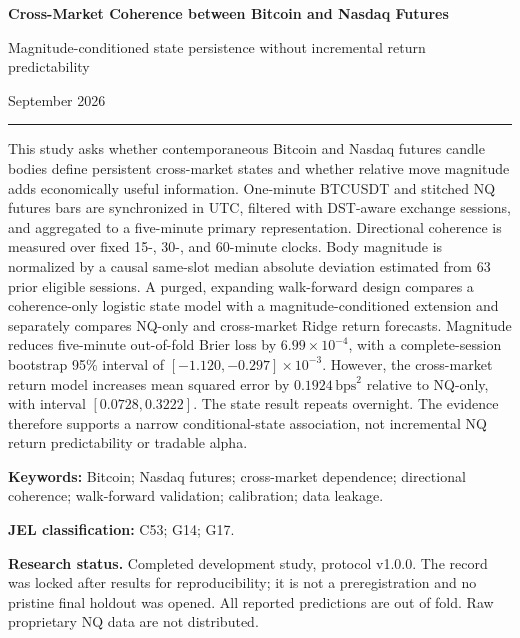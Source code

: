 \documentclass[11pt]{article}
\newcommand{\bps}{\mathrm{bps}}
\newcommand{\statusline}[1]{\noindent\small #1}
\begin{document}
\begin{titlepage}
  \thispagestyle{empty}
  \vspace*{1.5cm}
  {\raggedright\Huge\bfseries
    Cross-Market Coherence between Bitcoin and Nasdaq Futures\par}
  \vspace{0.35cm}
  {\raggedright\Large
    Magnitude-conditioned state persistence without incremental return predictability\par}
  \vspace{0.85cm}
  \par
  \vspace{0.12cm}
  \statusline{September 2026}
  \vspace{0.65cm}
  \hrule
  \vspace{0.5cm}

  \par
  \vspace{0.25cm}
  {\small\noindent
  This study asks whether contemporaneous Bitcoin and Nasdaq futures candle bodies
  define persistent cross-market states and whether relative move magnitude adds
  economically useful information. One-minute BTCUSDT and stitched NQ futures bars are
  synchronized in UTC, filtered with DST-aware exchange sessions, and aggregated to a
  five-minute primary representation. Directional coherence is measured over fixed
  15-, 30-, and 60-minute clocks. Body magnitude is normalized by a causal same-slot
  median absolute deviation estimated from 63 prior eligible sessions. A purged,
  expanding walk-forward design compares a coherence-only logistic state model with a
  magnitude-conditioned extension and separately compares NQ-only and cross-market
  Ridge return forecasts. Magnitude reduces five-minute out-of-fold Brier loss by
  $6.99\times10^{-4}$, with a complete-session bootstrap 95\% interval of
  $[-1.120,-0.297]\times10^{-3}$. However, the cross-market return model increases mean
  squared error by $0.1924\,\bps^2$ relative to NQ-only, with interval
  $[0.0728,0.3222]$. The state result repeats overnight. The evidence therefore supports
  a narrow conditional-state association, not incremental NQ return predictability or
  tradable alpha.\par}

  \vspace{0.45cm}
  \noindent\small\textbf{Keywords:} Bitcoin; Nasdaq futures; cross-market dependence;
  directional coherence; walk-forward validation; calibration; data leakage.\par
  \vspace{0.2cm}
  \noindent\textbf{JEL classification:} C53; G14; G17.\par
  \vfill
  \noindent\small\textbf{Research status.} Completed development study, protocol
  v1.0.0. The record was locked after results for reproducibility; it is not a
  preregistration and no pristine final holdout was opened. All reported predictions are
  out of fold. Raw proprietary NQ data are not distributed.
\end{titlepage}
\end{document}
